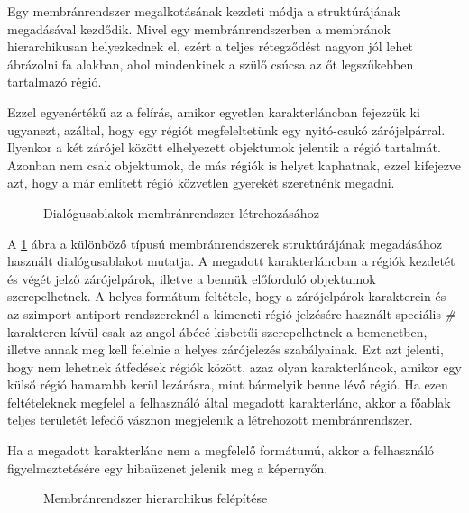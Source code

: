 Egy membránrendszer megalkotásának kezdeti módja a struktúrájának megadásával kezdődik. Mivel egy membránrendszerben a membránok hierarchikusan helyezkednek el, ezért a teljes rétegződést nagyon jól lehet ábrázolni fa alakban, ahol mindenkinek a szülő csúcsa az őt legszűkebben tartalmazó régió. 

Ezzel egyenértékű az a felírás, amikor egyetlen karakterláncban fejezzük ki ugyanezt, azáltal, hogy egy régiót megfeleltetünk egy nyitó-csukó zárójelpárral. Ilyenkor a két zárójel között elhelyezett objektumok jelentik a régió tartalmát. Azonban nem csak objektumok, de más régiók is helyet kaphatnak, ezzel kifejezve azt, hogy a már említett régió közvetlen gyerekét szeretnénk megadni. 

\begin{figure}[H]
	\centering
	\vspace{5pt}
	\caption{Dialógusablakok membránrendszer létrehozásához}
	\label{fig:create_system}
\end{figure}

A \ref{fig:create_system} ábra a különböző típusú membránrendszerek struktúrájának megadásához használt dialógusablakot mutatja. A megadott karakterláncban a régiók kezdetét és végét jelző zárójelpárok, illetve a bennük előforduló objektumok szerepelhetnek.
A helyes formátum feltétele, hogy a zárójelpárok karakterein és az szimport-antiport rendszereknél a kimeneti régió jelzésére használt speciális \textit{\#} karakteren kívül csak az angol ábécé kisbetűi szerepelhetnek a bemenetben, illetve annak meg kell felelnie a helyes zárójelezés szabályainak. Ezt azt jelenti, hogy nem lehetnek átfedések régiók között, azaz olyan karakterláncok, amikor egy külső régió hamarabb kerül lezárásra, mint bármelyik benne lévő régió. Ha ezen feltételeknek megfelel a felhasználó által megadott karakterlánc, akkor a főablak teljes területét lefedő vásznon megjelenik a létrehozott membránrendszer.

Ha a megadott karakterlánc nem a megfelelő formátumú, akkor a felhasználó figyelmeztetésére egy hibaüzenet jelenik meg a képernyőn. 

\begin{figure}
\centering
{}
\caption{Membránrendszer hierarchikus felépítése\protect\footnotemark}\label{fig:structure_graph}
\end{figure}

